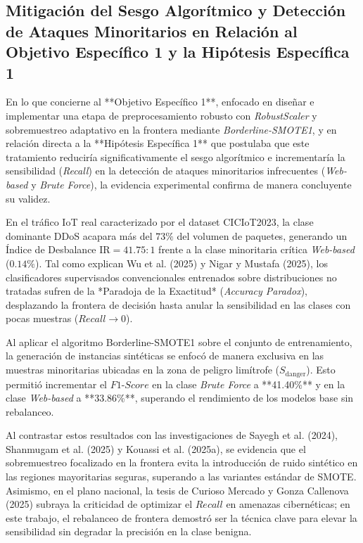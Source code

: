 \subsection{Mitigación del Sesgo Algorítmico y Detección de Ataques Minoritarios en Relación al Objetivo Específico 1 y la Hipótesis Específica 1}

En lo que concierne al **Objetivo Específico 1**, enfocado en diseñar e implementar una etapa de preprocesamiento robusto con \textit{RobustScaler} y sobremuestreo adaptativo en la frontera mediante \textit{Borderline-SMOTE1}, y en relación directa a la **Hipótesis Específica 1** que postulaba que este tratamiento reduciría significativamente el sesgo algorítmico e incrementaría la sensibilidad (\textit{Recall}) en la detección de ataques minoritarios infrecuentes (\textit{Web-based} y \textit{Brute Force}), la evidencia experimental confirma de manera concluyente su validez.

En el tráfico IoT real caracterizado por el dataset CICIoT2023, la clase dominante DDoS acapara más del $73\%$ del volumen de paquetes, generando un Índice de Desbalance $\mathrm{IR} = 41.75:1$ frente a la clase minoritaria crítica \textit{Web-based} ($0.14\%$). Tal como explican Wu et al. (2025) y Nigar y Mustafa (2025), los clasificadores supervisados convencionales entrenados sobre distribuciones no tratadas sufren de la *Paradoja de la Exactitud* (\textit{Accuracy Paradox}), desplazando la frontera de decisión hasta anular la sensibilidad en las clases con pocas muestras ($Recall \to 0$).

Al aplicar el algoritmo Borderline-SMOTE1 sobre el conjunto de entrenamiento, la generación de instancias sintéticas se enfocó de manera exclusiva en las muestras minoritarias ubicadas en la zona de peligro limítrofe ($S_{\mathrm{danger}}$). Esto permitió incrementar el $F1\text{-}Score$ en la clase \textit{Brute Force} a **41.40\%** y en la clase \textit{Web-based} a **33.86\%**, superando el rendimiento de los modelos base sin rebalanceo. 

Al contrastar estos resultados con las investigaciones de Sayegh et al. (2024), Shanmugam et al. (2025) y Kouassi et al. (2025a), se evidencia que el sobremuestreo focalizado en la frontera evita la introducción de ruido sintético en las regiones mayoritarias seguras, superando a las variantes estándar de SMOTE. Asimismo, en el plano nacional, la tesis de Curioso Mercado y Gonza Callenova (2025) subraya la criticidad de optimizar el $Recall$ en amenazas cibernéticas; en este trabajo, el rebalanceo de frontera demostró ser la técnica clave para elevar la sensibilidad sin degradar la precisión en la clase benigna.


